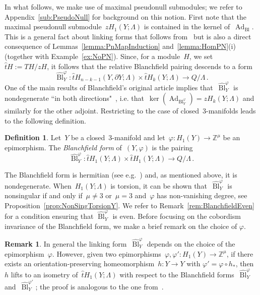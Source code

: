 \documentclass[10.9pt,a4paper]{amsart}
\theoremstyle{definition}
\newtheorem{definition}[theorem]{Definition}
\newtheorem{remark}[theorem]{Remark}
\theoremstyle{remark}
\newcommand{\Z}{\mathbb{Z}}
\newcommand{\Bl}{\operatorname{Bl}}
\newcommand{\Ad}{\operatorname{Ad}}
\newcommand{\that}{\hat{t}}
\begin{document}
In what follows, we make use of maximal pseudonull submodules; we refer to Appendix~\ref{sub:PseudoNull} for background on this notion.
First note that the maximal pseudonull submodule~$z H_1(Y;\Lambda)$ is contained in the kernel of~$\Ad_{\Bl}$.
This is a general fact about linking forms that follows from~\cite[Theorem~3.9~(3)]{Hillman} but is also a direct consequence of Lemmas~\ref{lemma:PnMapInduction} and~\ref{lemma:HomPN}(i) (together with Example~\ref{ex:NoPN}).
Since,  for a module~$H$, we set~$\that H:=TH/zH$, it follows that the relative Blanchfield pairing descends to a form 
$$
\hat{\Bl}_Y^\varphi \colon \that H_{n-k-1}(Y,\partial Y;\Lambda) \times \that H_k(Y;\Lambda)  \to Q/\Lambda\,.
$$
One of the main results of Blanchfield's original article implies that~$\hat{\Bl}_Y^\varphi$ is nondegenerate ``in both directions"~\cite[Theorems 3.2 and 3.3]{Blanchfield},  i.e. that~$\ker(\Ad_{\Bl_Y^\varphi})=zH_k(Y;\Lambda)$ and similarly for the other adjoint.
Restricting to the case of closed~$3$-manifolds leads to the following definition.


\begin{definition}
\label{def:BlanchfieldY}
Let~$Y$ be a closed~$3$-manifold and let~$\varphi \colon H_1(Y) \to \Z^\mu$ be an epimorphism.
The \emph{Blanchfield form} of~$(Y,\varphi)$ is the pairing
\[
\hat{\Bl}_Y^\varphi \colon \that H_1(Y;\Lambda) \times \that H_1(Y;\Lambda)  \to Q/\Lambda\,.
\] 
\end{definition}

The Blanchfield form is hermitian (see e.g.~\cite[Theorem 1(d)]{Powell}) and, as mentioned above, it is nondegenerate.
When~$H_1(Y;\Lambda)$ is torsion,  it can be shown that~$\hat{\Bl}_Y^\varphi$ is nonsingular
if and only if~$\mu\neq 3$ or~$\mu=3$ and~$\varphi$ has non-vanishing degree, see Proposition~\ref{prop:NonSingTorsionY}.
We refer to Remark~\ref{rem:BlanchfieldEven} for a condition ensuring that $\hat{\Bl}_Y^\varphi$ is even.
Before focusing on the cobordism invariance of the Blanchfield form, we make a brief remark on the choice of $\varphi$.

\begin{remark}
\label{rem:BlChoicePhi}
In general the linking form~$\hat{\Bl}_Y^\varphi$ depends on the choice of the epimorphism~$\varphi$.
However,  given two epimorphisms~$\varphi,\varphi' \colon H_1(Y) \to \Z^\mu$,  if there exists an orientation-preserving homeomorphism~$h \colon Y \to Y$ with $\varphi'=\varphi \circ h_*$, then~$h$ lifts to an isometry of~$\that H_1(Y;\Lambda)$ with respect to the Blanchfield forms~$\hat{\Bl}_Y^\varphi $ and~$\hat{\Bl}_Y^{\varphi'}$; the proof is analogous to the one from~\cite[Proposition~3.7]{ConwayPowell}.
\end{remark}
\end{document}
